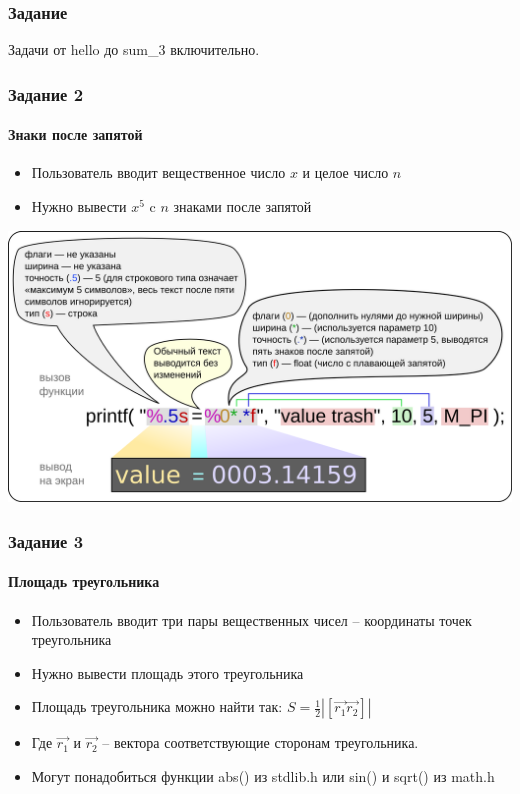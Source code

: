 \documentclass[12pt,pdf,hyperref={unicode}]{beamer}
\begin{document}
\begin{frame}
\frametitle{Задание} 
Задачи от hello до sum\_3 включительно.
\end{frame}





\iffalse

\begin{frame}
\frametitle{Задание 2} 
\framesubtitle{Знаки после запятой} 
\begin{center}
\begin{itemize}
\item Пользователь вводит вещественное число $x$ и целое число $n$ \\
\item Нужно вывести $x^5$ c $n$ знаками после запятой\\
\end{itemize}
\end{center}
\begin{center}
\includegraphics[scale=0.5]{Printf_illustration.png}
\end{center}
\end{frame}

\begin{frame}
\frametitle{Задание 3} 
\framesubtitle{Площадь треугольника} 
\begin{center}
\begin{itemize}
\item Пользователь вводит три пары вещественных чисел -- координаты точек треугольника\\
\item Нужно вывести площадь этого треугольника\\
\item Площадь треугольника можно найти так: $S = \frac{1}{2}|[\vec{r_1} \vec{r_2}]|$\\
\item Где $\vec{r_1}$ и $\vec{r_2}$ -- вектора соответствующие сторонам треугольника.
\item Могут понадобиться функции abs() из stdlib.h или sin() и sqrt() из math.h
\end{itemize}
\end{center}
\end{frame}
\end{document}
